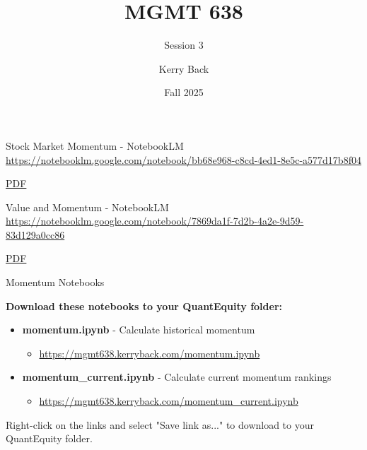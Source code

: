 \documentclass[aspectratio=169]{beamer}
\title{MGMT 638}
\subtitle{Session 3}
\author{Kerry Back}
\institute{}
\date{Fall 2025}
\begin{document}
\maketitle

\begin{frame}{Stock Market Momentum - NotebookLM}
\centering
\Large
\url{https://notebooklm.google.com/notebook/bb68e968-c8cd-4ed1-8e5c-a577d17b8f04}

\vspace{1em}

\href{https://mgmt638.kerryback.com/Jegadeesh_Titman_ARFE_2011.pdf}{PDF}
\end{frame}

\begin{frame}{Value and Momentum - NotebookLM}
\centering
\Large
\url{https://notebooklm.google.com/notebook/7869da1f-7d2b-4a2e-9d59-83d129a0cc86}

\vspace{1em}

\href{https://mgmt638.kerryback.com/Asness_Moskowitz_Pedersen_2013.pdf}{PDF}
\end{frame}

\begin{frame}{Momentum Notebooks}

\textbf{Download these notebooks to your QuantEquity folder:}

\vspace{1em}

\begin{itemize}
    \item \textbf{momentum.ipynb} - Calculate historical momentum
    \begin{itemize}
        \item \url{https://mgmt638.kerryback.com/momentum.ipynb}
    \end{itemize}

    \vspace{0.5em}

    \item \textbf{momentum\_current.ipynb} - Calculate current momentum rankings
    \begin{itemize}
        \item \url{https://mgmt638.kerryback.com/momentum_current.ipynb}
    \end{itemize}
\end{itemize}

\vspace{1em}

\small
Right-click on the links and select "Save link as..." to download to your QuantEquity folder.

\end{frame}
\end{document}
